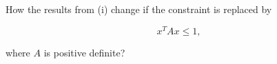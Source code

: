 How the results from (i) change if the constraint is replaced by

$$
x^T A x \le 1,
$$

where $A$ is positive definite?

\begin{solution}
    \ \\
    \vfill
\end{solution}